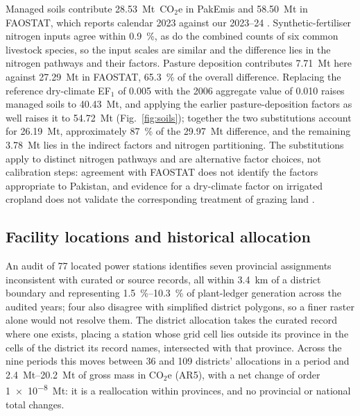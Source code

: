 \documentclass[essd,manuscript]{copernicus}
\begin{document}
Managed soils contribute \SI{28.53}{\mega\tonne}~CO$_2$e in PakEmis and \SI{58.50}{\mega\tonne} in FAOSTAT, which reports calendar 2023 against our 2023--24 \citep{FAOSTAT2025}. Synthetic-fertiliser nitrogen inputs agree within \SI{0.9}{\percent}, as do the combined counts of six common livestock species, so the input scales are similar and the difference lies in the nitrogen pathways and their factors. Pasture deposition contributes \SI{7.71}{\mega\tonne} here against \SI{27.29}{\mega\tonne} in FAOSTAT, \SI{65.3}{\percent} of the overall difference. Replacing the reference dry-climate EF$_1$ of \num{0.005} with the 2006 aggregate value of \num{0.010} raises managed soils to \SI{40.43}{\mega\tonne}, and applying the earlier pasture-deposition factors as well raises it to \SI{54.72}{\mega\tonne} (Fig.~\ref{fig:soils}); together the two substitutions account for \SI{26.19}{\mega\tonne}, approximately \SI{87}{\percent} of the \SI{29.97}{\mega\tonne} difference, and the remaining \SI{3.78}{\mega\tonne} lies in the indirect factors and nitrogen partitioning. The substitutions apply to distinct nitrogen pathways and are alternative factor choices, not calibration steps: agreement with FAOSTAT does not identify the factors appropriate to Pakistan, and evidence for a dry-climate factor on irrigated cropland does not validate the corresponding treatment of grazing land \citep{IPCC2019}.

\subsection{Facility locations and historical allocation}
\label{sec:locations}

An audit of \num{77} located power stations identifies seven provincial assignments inconsistent with curated or source records, all within \SI{3.4}{\kilo\metre} of a district boundary and representing \SIrange{1.5}{10.3}{\percent} of plant-ledger generation across the audited years; four also disagree with simplified district polygons, so a finer raster alone would not resolve them. The district allocation takes the curated record where one exists, placing a station whose grid cell lies outside its province in the cells of the district its record names, intersected with that province. Across the nine periods this moves between \num{36} and \num{109} districts' allocations in a period and \SIrange{2.4}{20.2}{\mega\tonne} of gross mass in CO$_2$e (AR5), with a net change of order \num{1e-8}~Mt: it is a reallocation within provinces, and no provincial or national total changes.
\end{document}
